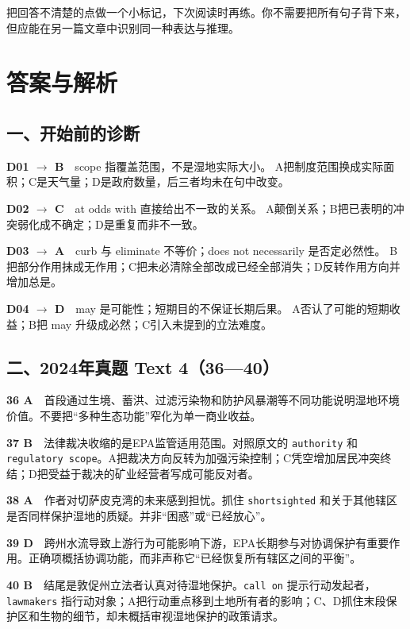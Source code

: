 \documentclass[a4paper,11pt,openany]{report}
\begin{document}
把回答不清楚的点做一个小标记，下次阅读时再练。你不需要把所有句子背下来，但应能在另一篇文章中识别同一种表达与推理。

\chapter{答案与解析}\label{ux7b54ux6848ux4e0eux89e3ux6790}

\section{一、开始前的诊断}\label{ux4e00ux5f00ux59cbux524dux7684ux8bcaux65ad}

\textbf{D01 \(\rightarrow\) B}　scope 指覆盖范围，不是湿地实际大小。 A把制度范围换成实际面积；C是天气量；D是政府数量，后三者均未在句中改变。

\textbf{D02 \(\rightarrow\) C}　at odds with 直接给出不一致的关系。 A颠倒关系；B把已表明的冲突弱化成不确定；D是重复而非不一致。

\textbf{D03 \(\rightarrow\) A}　curb 与 eliminate 不等价；does not necessarily 是否定必然性。 B把部分作用抹成无作用；C把未必清除全部改成已经全部消失；D反转作用方向并增加总是。

\textbf{D04 \(\rightarrow\) D}　may 是可能性；短期目的不保证长期后果。 A否认了可能的短期收益；B把 may 升级成必然；C引入未提到的立法难度。

\section{二、2024年真题 Text 4（36---40）}\label{ux4e8c2024ux5e74ux771fux9898-text-43640}

\textbf{36 A}　首段通过生境、蓄洪、过滤污染物和防护风暴潮等不同功能说明湿地环境价值。不要把``多种生态功能''窄化为单一商业收益。

\textbf{37 B}　法律裁决收缩的是EPA监管适用范围。对照原文的 \texttt{authority} 和 \texttt{regulatory\ scope}。A把裁决方向反转为加强污染控制；C凭空增加居民冲突终结；D把受益于裁决的矿业经营者写成可能反对者。

\textbf{38 A}　作者对切萨皮克湾的未来感到担忧。抓住 \texttt{shortsighted} 和关于其他辖区是否同样保护湿地的质疑。并非``困惑''或``已经放心''。

\textbf{39 D}　跨州水流导致上游行为可能影响下游，EPA长期参与对协调保护有重要作用。正确项概括协调功能，而非声称它``已经恢复所有辖区之间的平衡''。

\textbf{40 B}　结尾是敦促州立法者认真对待湿地保护。\texttt{call\ on} 提示行动发起者，\texttt{lawmakers} 指行动对象；A把行动重点移到土地所有者的影响；C、D抓住末段保护区和生物的细节，却未概括审视湿地保护的政策请求。
\end{document}
